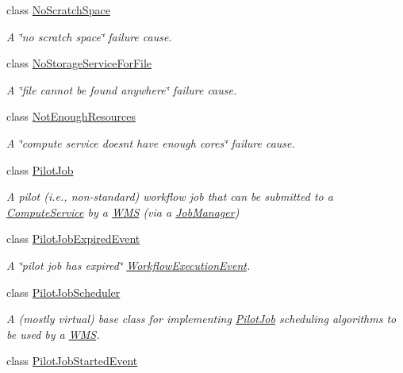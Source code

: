 \begin{DoxyCompactItemize}
class \hyperlink{classwrench_1_1_no_scratch_space}{No\+Scratch\+Space}
\begin{DoxyCompactList}\small\item\em A \char`\"{}no scratch space\char`\"{} failure cause. \end{DoxyCompactList}\item 
class \hyperlink{classwrench_1_1_no_storage_service_for_file}{No\+Storage\+Service\+For\+File}
\begin{DoxyCompactList}\small\item\em A \char`\"{}file cannot be found anywhere\char`\"{} failure cause. \end{DoxyCompactList}\item 
class \hyperlink{classwrench_1_1_not_enough_resources}{Not\+Enough\+Resources}
\begin{DoxyCompactList}\small\item\em A \char`\"{}compute service doesn\textquotesingle{}t have enough cores\char`\"{} failure cause. \end{DoxyCompactList}\item 
class \hyperlink{classwrench_1_1_pilot_job}{Pilot\+Job}
\begin{DoxyCompactList}\small\item\em A pilot (i.\+e., non-\/standard) workflow job that can be submitted to a \hyperlink{classwrench_1_1_compute_service}{Compute\+Service} by a \hyperlink{classwrench_1_1_w_m_s}{W\+MS} (via a \hyperlink{classwrench_1_1_job_manager}{Job\+Manager}) \end{DoxyCompactList}\item 
class \hyperlink{classwrench_1_1_pilot_job_expired_event}{Pilot\+Job\+Expired\+Event}
\begin{DoxyCompactList}\small\item\em A \char`\"{}pilot job has expired\char`\"{} \hyperlink{classwrench_1_1_workflow_execution_event}{Workflow\+Execution\+Event}. \end{DoxyCompactList}\item 
class \hyperlink{classwrench_1_1_pilot_job_scheduler}{Pilot\+Job\+Scheduler}
\begin{DoxyCompactList}\small\item\em A (mostly virtual) base class for implementing \hyperlink{classwrench_1_1_pilot_job}{Pilot\+Job} scheduling algorithms to be used by a \hyperlink{classwrench_1_1_w_m_s}{W\+MS}. \end{DoxyCompactList}\item 
class \hyperlink{classwrench_1_1_pilot_job_started_event}{Pilot\+Job\+Started\+Event}

\end{DoxyCompactItemize}

